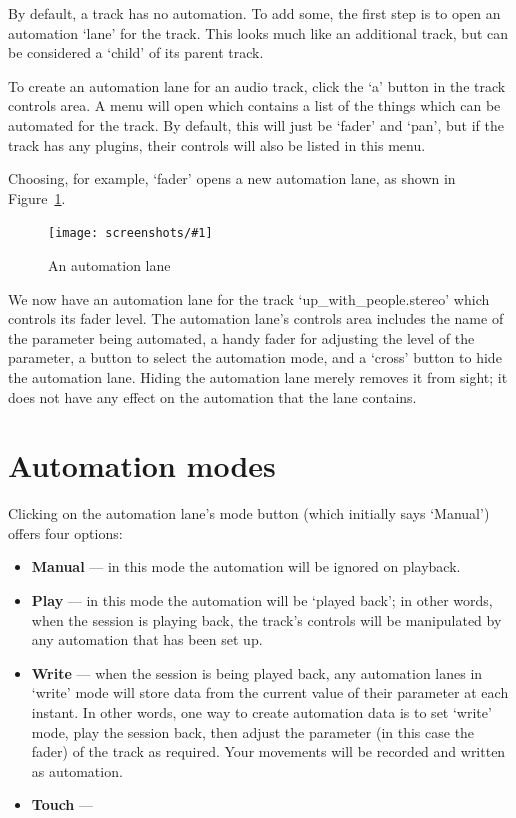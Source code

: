 \documentclass[10pt,a4paper]{book}
\newcommand{\todo}[1]{\marginpar{\small\texttt{#1}}}
\newcommand{\screenshot}[3]{%
\begin{figure}[ht]%
\begin{center}
\texttt{[image: screenshots/\#1]}
\end{center}
\caption{#2}
\label{#3}
\end{figure}}
\begin{document}
By default, a track has no automation.  To add some, the first step is
to open an automation `lane' for the track.  This looks much like an
additional track, but can be considered a `child' of its parent track.

To create an automation lane for an audio track, click the `a' button
in the track controls area.  A menu will open which contains a list of
the things which can be automated for the track.  By default, this
will just be `fader' and `pan', but if the track has any plugins,
their controls will also be listed in this menu.

Choosing, for example, `fader' opens a new automation lane, as shown
in Figure~\ref{fig:automation-lane}.

\screenshot{automation-lane.png}{An automation lane}{fig:automation-lane}

We now have an automation lane for the track `up\_with\_people.stereo'
which controls its fader level.  The automation lane's controls area
includes the name of the parameter being automated, a handy fader for
adjusting the level of the parameter, a button to select the
automation mode, and a `cross' button to hide the automation lane.
Hiding the automation lane merely removes it from sight; it does not
have any effect on the automation that the lane contains.


\section{Automation modes}

Clicking on the automation lane's mode button (which initially says `Manual') offers four options:

\begin{itemize}
\item \textbf{Manual} --- in this mode the automation will be ignored on playback.
\item \textbf{Play} --- in this mode the automation will be `played
  back'; in other words, when the session is playing back, the track's
  controls will be manipulated by any automation that has been set up.
\item \textbf{Write} --- when the session is being played back, any
  automation lanes in `write' mode will store data from the current
  value of their parameter at each instant.  In other words, one way
  to create automation data is to set `write' mode, play the session
  back, then adjust the parameter (in this case the fader) of the
  track as required.  Your movements will be recorded and written as
  automation.
\item \textbf{Touch} --- \todo{doesn't seem to work right now}
\end{itemize}
\end{document}
